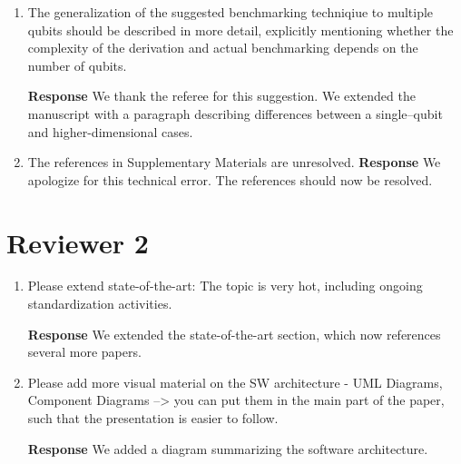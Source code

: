\documentclass[a4paper,12pt]{article}
\newcommand{\1}{{\rm 1\hspace{-0.9mm}l}}
\newenvironment{response}{\vspace{1em}\noindent\textbf{Response}}{\vspace{1em}}
\begin{document}
\begin{enumerate}
    \begin{response}
      We modified manuscript to include mention of cross-entropy benchmarking
      as suggested by the referee.
    \end{response}
  \item The generalization of the suggested benchmarking techniqiue to multiple
    qubits should be described in more detail, explicitly mentioning whether
    the complexity of the derivation and actual benchmarking depends on the
    number of qubits.

    \begin{response}
      We thank the referee for this suggestion. We extended the manuscript with
      a paragraph describing differences between a single--qubit and
      higher-dimensional cases.
    \end{response}
  \item The references in Supplementary Materials are unresolved.
    \begin{response}
      We apologize for this technical error. The references should now be resolved.
    \end{response}
\end{enumerate}
\section{Reviewer 2}
\begin{enumerate}
  \item Please extend state-of-the-art: The topic is very hot, including ongoing
    standardization activities.

    \begin{response}
      We extended the state-of-the-art section, which now references several more papers.
    \end{response}
  \item Please add more visual material on the SW architecture - UML Diagrams, Component
    Diagrams --> you can put them in the main part of the paper, such
    that the presentation is easier to follow.

    \begin{response}
      We added a diagram summarizing the software architecture.
    \end{response}
\end{enumerate}
\end{document}
